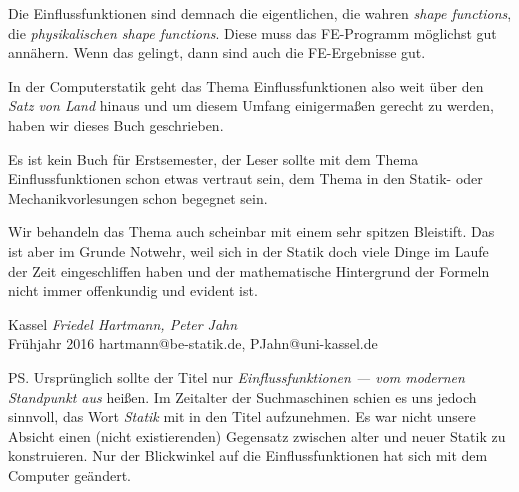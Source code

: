 Die Einflussfunktionen sind demnach die eigentlichen, die wahren {\em shape functions\/}, die {\em physikalischen shape functions\/}. Diese muss das FE-Programm  m\"{o}glichst gut ann\"{a}hern. Wenn das gelingt, dann sind auch die FE-Ergebnisse gut.

In der Computerstatik geht das Thema Einflussfunktionen also weit \"{u}ber den {\em Satz von Land\/} hinaus und um diesem Umfang einigerma{\ss}en gerecht zu werden, haben wir dieses Buch geschrieben.

Es ist kein Buch f\"{u}r Erstsemester, der Leser sollte mit dem Thema Einflussfunktionen schon etwas vertraut sein, dem Thema in den Statik- oder Mechanikvorlesungen schon begegnet sein.

Wir behandeln das Thema auch scheinbar mit einem sehr spitzen Bleistift. Das ist aber im Grunde Notwehr, weil sich in der Statik doch viele Dinge  im Laufe der Zeit eingeschliffen haben und der mathematische Hintergrund der Formeln nicht immer offenkundig und evident ist.

\begin{flushright}\noindent
Kassel  {\hfill {\it Friedel Hartmann, Peter Jahn}}\\\vspace{0.1cm}
Fr\"{u}hjahr 2016   {\hfill {hartmann@be-statik.de, PJahn@uni-kassel.de}}\\
\end{flushright}


\vspace{1.7cm}
PS. Urspr\"{u}nglich sollte der Titel nur {\em Einflussfunktionen --- vom modernen Standpunkt aus\/} hei{\ss}en. Im Zeitalter der Suchmaschinen schien es uns jedoch sinnvoll, das Wort {\em Statik\/} mit in den Titel aufzunehmen. Es war nicht unsere Absicht einen (nicht existierenden) Gegensatz zwischen alter und neuer Statik zu konstruieren. Nur der Blickwinkel auf die Einflussfunktionen hat sich mit dem Computer ge\"{a}ndert.\\

